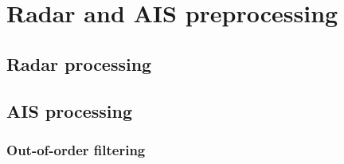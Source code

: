 
\chapter{Radar and AIS preprocessing}\label{chapter:radar-and-ais-preprocessing}

\section{Radar processing}


\section{AIS processing}

\subsection{Out-of-order filtering}


